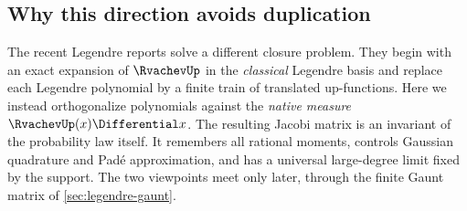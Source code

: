\documentclass[11pt,oneside]{article}
\theoremstyle{definition}
\theoremstyle{remark}
\numberwithin{equation}{section}
\begin{document}
\subsection{Why this direction avoids duplication}
The recent Legendre reports solve a different closure problem.  They begin
with an exact expansion of $\RvachevUp$ in the \emph{classical} Legendre basis and
replace each Legendre polynomial by a finite train of translated up-functions.
Here we instead orthogonalize polynomials against the \emph{native measure}
$\RvachevUp(x)\Differential x$.  The resulting Jacobi matrix is an invariant of the probability
law itself.  It remembers all rational moments, controls Gaussian quadrature
and Pad\'e approximation, and has a universal large-degree limit fixed by the
support.  The two viewpoints meet only later, through the finite Gaunt matrix
of \cref{sec:legendre-gaunt}.
\end{document}
